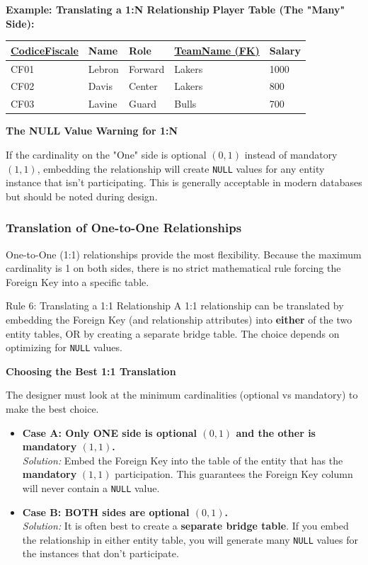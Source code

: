 \begin{example}{\textbf{Example: Translating a 1:N Relationship}}
\textbf{Player Table (The "Many" Side):}
\begin{center}
\begin{tabular}{|l|l|l|l|l|}
\hline
\textbf{\underline{CodiceFiscale}} & \textbf{Name} & \textbf{Role} & \textbf{\underline{TeamName (FK)}} & \textbf{Salary} \\
\hline
CF01 & Lebron & Forward & Lakers & 1000 \\
CF02 & Davis & Center & Lakers & 800 \\
CF03 & Lavine & Guard & Bulls & 700 \\
\hline
\end{tabular}
\end{center}
\end{example}

\vspace{0.3cm}
\textbf{The NULL Value Warning for 1:N}

If the cardinality on the "One" side is optional $(0,1)$ instead of mandatory $(1,1)$, embedding the relationship will create \texttt{NULL} values for any entity instance that isn't participating. This is generally acceptable in modern databases but should be noted during design.

\subsubsection{Translation of One-to-One Relationships}
One-to-One (1:1) relationships provide the most flexibility. Because the maximum cardinality is 1 on both sides, there is no strict mathematical rule forcing the Foreign Key into a specific table.

\begin{defbox}{Rule 6: Translating a 1:1 Relationship}
A 1:1 relationship can be translated by embedding the Foreign Key (and relationship attributes) into \textbf{either} of the two entity tables, OR by creating a separate bridge table. The choice depends on optimizing for \texttt{NULL} values.
\end{defbox}

\pagebreak
\textbf{Choosing the Best 1:1 Translation}

The designer must look at the minimum cardinalities (optional vs mandatory) to make the best choice.

\begin{itemize}
    \item \textbf{Case A: Only ONE side is optional $(0,1)$ and the other is mandatory $(1,1)$.}\\
    \textit{Solution:} Embed the Foreign Key into the table of the entity that has the \textbf{mandatory} $(1,1)$ participation. This guarantees the Foreign Key column will never contain a \texttt{NULL} value.
    
    \item \textbf{Case B: BOTH sides are optional $(0,1)$.}\\
    \textit{Solution:} It is often best to create a \textbf{separate bridge table}. If you embed the relationship in either entity table, you will generate many \texttt{NULL} values for the instances that don't participate.
\end{itemize}

